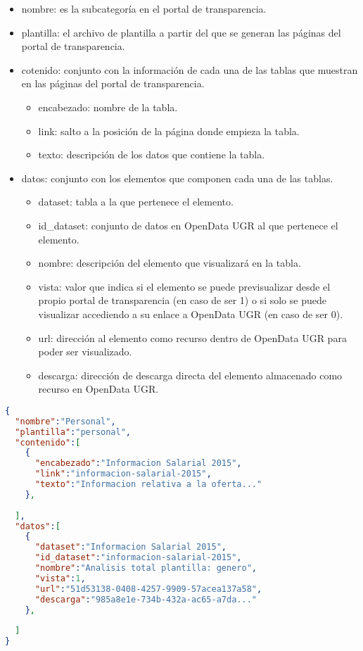 \begin{itemize}
	\item nombre: es la subcategoría en el portal de transparencia.
	\item plantilla: el archivo de plantilla a partir del que se generan las páginas del portal de transparencia.
	\item cotenido: conjunto con la información de cada una de las tablas que muestran en las páginas del portal de transparencia.
	\begin{itemize}
		\item encabezado: nombre de la tabla.
		\item link: salto a la posición de la página donde empieza la tabla.
		\item texto: descripción de los datos que contiene la tabla.
	\end{itemize}
	\item datos: conjunto con los elementos que componen cada una de las tablas.
	\begin{itemize}
		\item dataset: tabla a la que pertenece el elemento.
		\item id\_dataset: conjunto de datos en OpenData UGR al que pertenece el elemento.
		\item nombre: descripción del elemento que visualizará en la tabla.
		\item vista: valor que indica si el elemento se puede previsualizar desde el propio portal de transparencia (en caso de ser 1) o si solo se puede visualizar accediendo a su enlace a OpenData UGR (en caso de ser 0).
		\item url: dirección al elemento como recurso dentro de OpenData UGR para poder ser visualizado.
		\item descarga: dirección de descarga directa del elemento almacenado como recurso en OpenData UGR.
	\end{itemize}
\end{itemize}

\begin{lstlisting}[language=json,caption={Archivo {\tt JSON} con informacion de personal},label={lst:json_personal}]
{
  "nombre":"Personal",
  "plantilla":"personal",
  "contenido":[
    {
      "encabezado":"Informacion Salarial 2015",
      "link":"informacion-salarial-2015",
      "texto":"Informacion relativa a la oferta..."
    },
    
  ],
  "datos":[
    {
      "dataset":"Informacion Salarial 2015",
      "id_dataset":"informacion-salarial-2015",
      "nombre":"Analisis total plantilla: genero",
      "vista":1,
      "url":"51d53138-0408-4257-9909-57acea137a58",
      "descarga":"985a8e1e-734b-432a-ac65-a7da..."
    },
        
  ]
}
\end{lstlisting}

